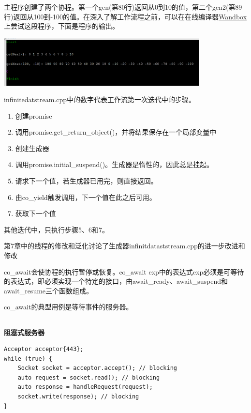 主程序创建了两个协程。第一个gen(第80行)返回从0到10的值，第二个gen2(第89行)返回从100到-100的值。在深入了解工作流程之前，可以在在线编译器\href{https://wandbox.org/}{Wandbox}上尝试这段程序，下面是程序的输出。

\begin{center}
\includegraphics[width=0.8\textwidth]{content/3/chapter6/images/5.png}\\
\end{center}

infinitedatstream.cpp中的数字代表工作流第一次迭代中的步骤。

\begin{enumerate}
\item 
创建promise

\item 
调用promise.get\_return\_object()，并将结果保存在一个局部变量中

\item 
创建生成器

\item 
调用promise.initial\_suspend()。生成器是惰性的，因此总是挂起。

\item 
请求下一个值，若生成器已用完，则直接返回。

\item 
由co\_yield触发调用，下一个值在此之后可用。

\item 
获取下一个值
\end{enumerate}

其他迭代中，只执行步骤5、6和7。

第7章中的线程的修改和泛化讨论了生成器infinitdataststream.cpp的进一步改进和修改


co\_await会使协程的执行暂停或恢复。co\_await exp中的表达式exp必须是可等待的表达式，即必须实现一个特定的接口，由await\_ready、await\_suspend和await\_resume三个函数组成。

co\_await的典型用例是等待事件的服务器。

\hspace*{\fill} \\ %
\noindent
\textbf{阻塞式服务器}
\begin{lstlisting}[style=styleCXX]
Acceptor acceptor{443};
while (true) {
	Socket socket = acceptor.accept(); // blocking
	auto request = socket.read(); // blocking
	auto response = handleRequest(request);
	socket.write(response); // blocking
}
\end{lstlisting}

